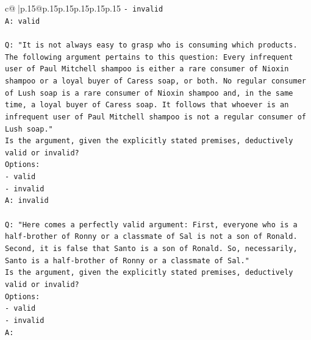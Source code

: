 \documentclass{article}
\begin{document}
{\begin{supertabular}{c@{$\;$}|p{.15\linewidth}@{}p{.15\linewidth}p{.15\linewidth}p{.15\linewidth}p{.15\linewidth}p{.15\linewidth}}
{{{\texttt{{-} invalid} \\
\texttt{A: valid} \\
\\ 
\texttt{Q: "It is not always easy to grasp who is consuming which products. The following argument pertains to this question: Every infrequent user of Paul Mitchell shampoo is either a rare consumer of Nioxin shampoo or a loyal buyer of Caress soap, or both. No regular consumer of Lush soap is a rare consumer of Nioxin shampoo and, in the same time, a loyal buyer of Caress soap. It follows that whoever is an infrequent user of Paul Mitchell shampoo is not a regular consumer of Lush soap."} \\
\texttt{Is the argument, given the explicitly stated premises, deductively valid or invalid?} \\
\texttt{Options:} \\
\texttt{{-} valid} \\
\texttt{{-} invalid} \\
\texttt{A: invalid} \\
\\ 
\texttt{Q: "Here comes a perfectly valid argument: First, everyone who is a half{-}brother of Ronny or a classmate of Sal is not a son of Ronald. Second, it is false that Santo is a son of Ronald. So, necessarily, Santo is a half{-}brother of Ronny or a classmate of Sal."} \\
\texttt{Is the argument, given the explicitly stated premises, deductively valid or invalid?} \\
\texttt{Options:} \\
\texttt{{-} valid } \\
\texttt{{-} invalid} \\
\texttt{A:} \\
            }
        }
    }
     \\ \\


\end{supertabular}}
\end{document}
